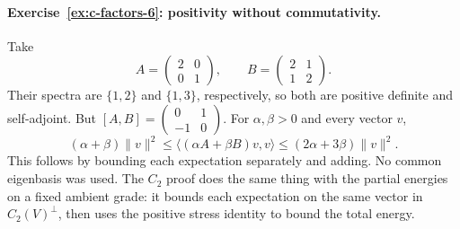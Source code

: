 \paragraph{Exercise~\ref{ex:c-factors-6}: positivity without commutativity.}
\label{sol:ex:c-factors-6}
Take
\[
 A=\begin{pmatrix}2&0\\0&1\end{pmatrix},
 \qquad B=\begin{pmatrix}2&1\\1&2\end{pmatrix}.
\]
Their spectra are $\{1,2\}$ and $\{1,3\}$, respectively, so both
are positive definite and self-adjoint. But
$[A,B]=\left(\begin{smallmatrix}0&1\\-1&0\end{smallmatrix}\right)$.
For $\alpha,\beta>0$ and every vector $v$,
\[
 (\alpha+\beta)\|v\|^2
 \leq
 \langle(\alpha A+\beta B)v,v\rangle
 \leq(2\alpha+3\beta)\|v\|^2.
\]
This follows by bounding each expectation separately and adding.
No common eigenbasis was used. The $C_2$ proof does the same
thing with the partial energies on a fixed ambient grade: it bounds
each expectation on the same vector in $C_2(V)^\perp$, then uses
the positive stress identity to bound the total energy.


